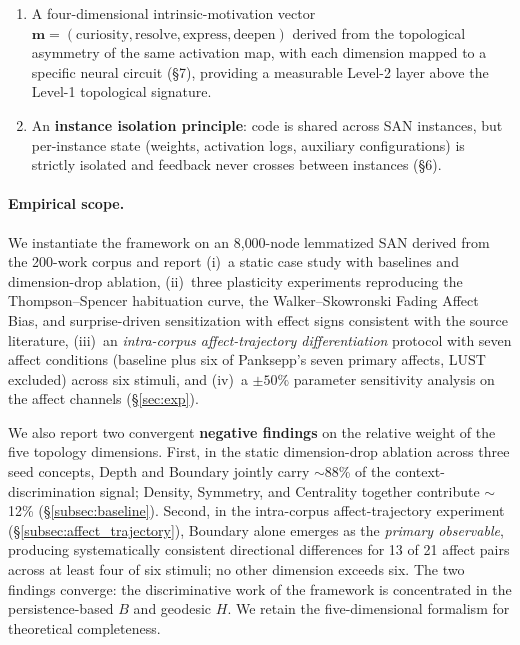 \documentclass{article}
\begin{document}
\begin{enumerate}
    \item A four-dimensional intrinsic-motivation vector
      $\mathbf{m} = (\mathrm{curiosity}, \mathrm{resolve}, \mathrm{express},
      \mathrm{deepen})$ derived from the topological asymmetry of the same
      activation map, with each dimension mapped to a specific neural
      circuit (\S 7), providing a measurable Level-2 layer above the
      Level-1 topological signature.
    \item An \textbf{instance isolation principle}: code is shared across
      SAN instances, but per-instance state (weights, activation logs,
      auxiliary configurations) is strictly isolated and feedback never
      crosses between instances (\S 6).
\end{enumerate}

\paragraph{Empirical scope.}
We instantiate the framework on an 8{,}000-node lemmatized SAN derived from
the 200-work corpus and report (i)~a static case study with baselines and
dimension-drop ablation, (ii)~three plasticity experiments reproducing the
Thompson--Spencer habituation curve, the Walker--Skowronski Fading Affect
Bias, and surprise-driven sensitization with effect signs consistent with
the source literature, (iii)~an \emph{intra-corpus affect-trajectory
differentiation} protocol with seven affect conditions (baseline plus six
of Panksepp's seven primary affects, LUST excluded) across six stimuli,
and (iv)~a $\pm 50\%$ parameter sensitivity analysis on the affect channels
(\S\ref{sec:exp}).

We also report two convergent \textbf{negative findings} on the relative
weight of the five topology dimensions. First, in the static
dimension-drop ablation across three seed concepts, Depth and Boundary
jointly carry $\sim$88\% of the context-discrimination signal; Density,
Symmetry, and Centrality together contribute $\sim$12\%
(\S\ref{subsec:baseline}). Second, in the intra-corpus affect-trajectory
experiment (\S\ref{subsec:affect_trajectory}), Boundary alone emerges as
the \emph{primary observable}, producing systematically consistent
directional differences for 13 of 21 affect pairs across at least four of
six stimuli; no other dimension exceeds six. The two findings converge:
the discriminative work of the framework is concentrated in the
persistence-based $B$ and geodesic $H$. We retain the five-dimensional
formalism for theoretical completeness.
\end{document}
